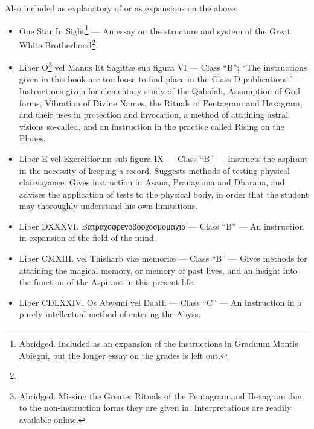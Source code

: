 Also included as explanatory of or as expansions on the above: \begin{itemize}
\item One Star In Sight\footnote{Abridged. Included as an expansion of the instructions in Graduum Montis Abiegni, but the longer essay on the grades is left out.} --- An essay on the structure and system of the Great White Brotherhood\footnote{\Argentium{}}.
\item Liber O\footnote{Abridged. Missing the Greater Rituals of the Pentagram and Hexagram due to the non-instruction forms they are given in. Interpretations are readily available online.} vel Manus Et Sagitt\ae{} sub figura VI --- Class \enquote{B}; \enquote{The instructions given in this book are too loose to find place in the Class D publications.} --- Instructions given for elementary study of the Qabalah, Assumption of God forms, Vibration of Divine Names, the Rituals of Pentagram and Hexagram, and their uses in protection and invocation, a method of attaining astral visions so-called, and an instruction in the practice called Rising on the Planes.
\item Liber E vel Exercitiorum sub figura IX --- Class \enquote{B} --- Instructs the aspirant in the necessity of keeping a record. Suggests methods of testing physical clairvoyance. Gives instruction in Asana, Pranayama and Dharana, and advises the application of tests to the physical body, in order that the student may thoroughly understand his own limitations.
\item Liber DXXXVI. Βατραχοφρενοβοοχοσμομαχια --- Class \enquote{B} --- An instruction in expansion of the field of the mind.
\item Liber CMXIII.  vel Thisharb vi\ae{}{} memori\ae{}{} --- Class \enquote{B} --- Gives methods for attaining the magical memory, or memory of past lives, and an insight into the function of the Aspirant in this present life.
\item Liber CDLXXIV. Os Abysmi vel Daath --- Class \enquote{C} --- An instruction in a purely intellectual method of entering the Abyss.
\end{itemize}
